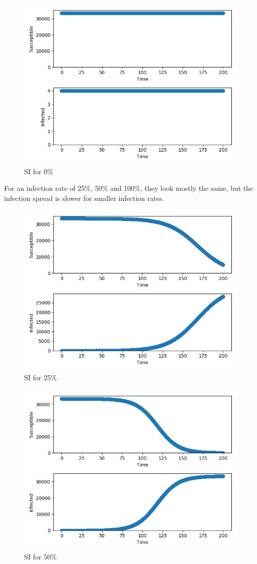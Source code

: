 \documentclass[12pt]{article}
\begin{document}
\begin{figure}[H]
    \centering
    \includegraphics[width=0.6\linewidth]{0per.png}
    \caption{SI for 0\%}
\end{figure}

For an infection rate of 25\%, 50\% and 100\%, they look mostly the same, but the infection spread is slower for smaller infection rates.

\begin{figure}[H]
    \centering
    \includegraphics[width=0.6\linewidth]{25per.png}
    \caption{SI for 25\%}
\end{figure}

\begin{figure}[H]
    \centering
    \includegraphics[width=0.6\linewidth]{50per.png}
    \caption{SI for 50\%}
\end{figure}
\end{document}
